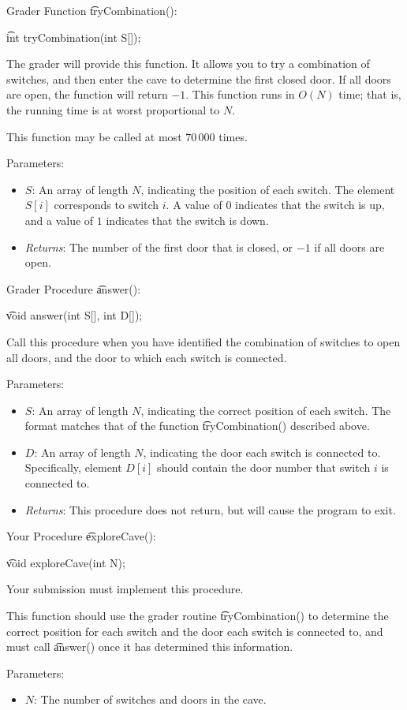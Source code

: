Grader Function \t{tryCombination()}:

\t{int tryCombination(int S[]);}

The grader will provide this function. It allows you to try a combination of switches, and then enter the cave to determine the first closed door. If all doors are open, the function will return $-­1$. This function runs in $O(N)$ time; that is, the running time is at worst proportional to $N$.

This function may be called at most $70\,000$ times. 

Parameters:
\begin{itemize}
\item $S$: An array of length $N$, indicating the position of each switch. The element $S[i]$ corresponds to switch $i$. A value of $0$ indicates that the switch is up, and a value of $1$ indicates that the switch is down.
\item \textit{Returns}: The number of the first door that is closed, or ­$-1$ if all doors are open.
\end{itemize}


       
Grader Procedure \t{answer()}:

\t{void answer(int S[], int D[]);}

Call this procedure when you have identified the combination of switches to open all doors, and the door to which each switch is connected.

Parameters:
\begin{itemize}
\item $S$: An array of length $N$, indicating the correct position of each switch. The format matches that of the function \t{tryCombination()} described above.
\item $D$: An array of length $N$, indicating the door each switch is connected to. Specifically, element $D[i]$ should contain the door number that switch $i$ is connected to.
\item \textit{Returns}: This procedure does not return, but will cause the program to exit.
\end{itemize}

Your Procedure \t{exploreCave()}:

\t{void exploreCave(int N);}

Your submission must implement this procedure.

This function should use the grader routine \t{tryCombination()} to determine the correct position for each switch and the door each switch is connected to, and must call \t{answer()} once it has determined this information.

Parameters:
\begin{itemize}
\item $N$: The number of switches and doors in the cave.
\end{itemize}
